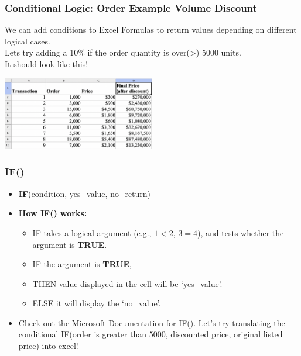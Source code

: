 \documentclass[12pt]{beamer}
\begin{document}
	\begin{frame}
		\frametitle{Conditional Logic: Order Example Volume Discount}
		We can add conditions to Excel Formulas to return values depending on different logical cases. \\
		Lets try adding a 10\% if the order quantity is over(>) 5000 units. \\
		It should look like this!
		\begin{center}
			\includegraphics[width=0.5\textwidth]{OrderConditional.png}
		\end{center}
	\end{frame}
	\begin{frame}
		\frametitle{IF()}
		\begin{itemize}
			\item \textbf{IF}(condition, yes\_value, no\_return)
			\item \textbf{How IF() works:}
			\begin{itemize}
				\item  IF takes a logical argument (e.g., $1<2$, $3=4$), and tests whether the argument is \textbf{TRUE}.
				\item  IF the argument is \textbf{TRUE},
				\item THEN value displayed in the cell will be `yes\_value'. \item ELSE it will display the `no\_value'.
			 \end{itemize}
			\item Check out the \textcolor{blue}{ \href{https://support.microsoft.com/en-us/office/if-function-69aed7c9-4e8a-4755-a9bc-aa8bbff73be2}{Microsoft Documentation for IF()}}. 
			\bigskip
			Let's try translating the conditional IF(order is greater than 5000, discounted price, original listed price) into excel!
	\end{itemize}
\end{frame}
\end{document}

